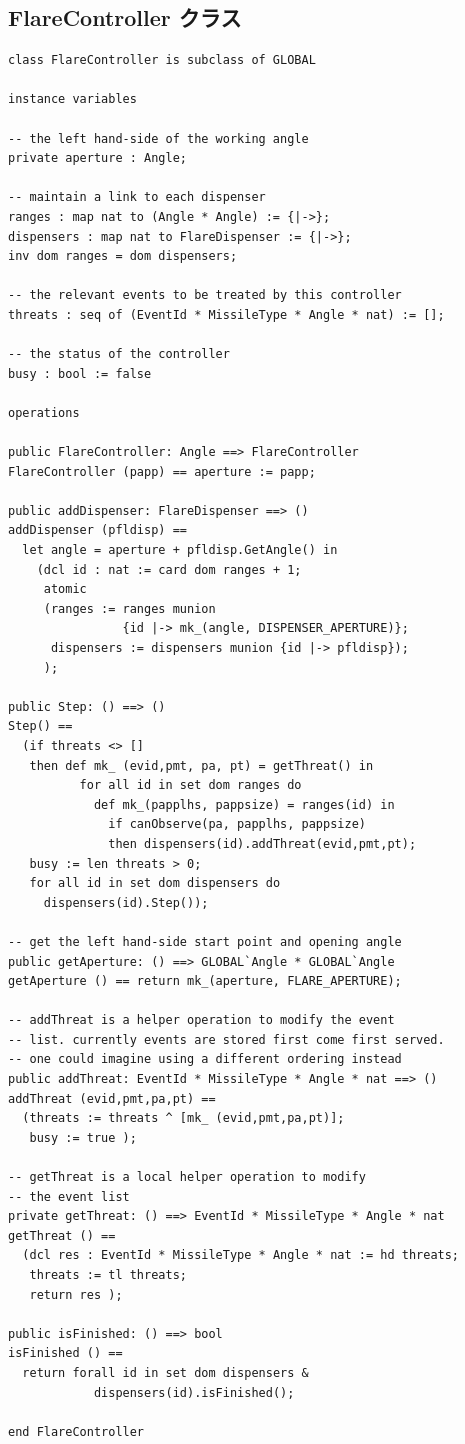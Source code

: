 \documentclass[\pformat,12pt]{jreport}
\begin{document}
\subsection{FlareController クラス}

\begin{lstlisting}
class FlareController is subclass of GLOBAL

instance variables

-- the left hand-side of the working angle
private aperture : Angle;

-- maintain a link to each dispenser
ranges : map nat to (Angle * Angle) := {|->};
dispensers : map nat to FlareDispenser := {|->};
inv dom ranges = dom dispensers;

-- the relevant events to be treated by this controller
threats : seq of (EventId * MissileType * Angle * nat) := [];

-- the status of the controller
busy : bool := false

operations

public FlareController: Angle ==> FlareController
FlareController (papp) == aperture := papp;

public addDispenser: FlareDispenser ==> ()
addDispenser (pfldisp) ==
  let angle = aperture + pfldisp.GetAngle() in
    (dcl id : nat := card dom ranges + 1;
     atomic
     (ranges := ranges munion 
                {id |-> mk_(angle, DISPENSER_APERTURE)};
      dispensers := dispensers munion {id |-> pfldisp});
     );

public Step: () ==> ()
Step() ==
  (if threats <> []
   then def mk_ (evid,pmt, pa, pt) = getThreat() in
          for all id in set dom ranges do
            def mk_(papplhs, pappsize) = ranges(id) in
              if canObserve(pa, papplhs, pappsize)
              then dispensers(id).addThreat(evid,pmt,pt);
   busy := len threats > 0;
   for all id in set dom dispensers do
     dispensers(id).Step());
 
-- get the left hand-side start point and opening angle
public getAperture: () ==> GLOBAL`Angle * GLOBAL`Angle
getAperture () == return mk_(aperture, FLARE_APERTURE);

-- addThreat is a helper operation to modify the event
-- list. currently events are stored first come first served.
-- one could imagine using a different ordering instead
public addThreat: EventId * MissileType * Angle * nat ==> ()
addThreat (evid,pmt,pa,pt) ==
  (threats := threats ^ [mk_ (evid,pmt,pa,pt)];
   busy := true );

-- getThreat is a local helper operation to modify 
-- the event list
private getThreat: () ==> EventId * MissileType * Angle * nat
getThreat () ==
  (dcl res : EventId * MissileType * Angle * nat := hd threats;
   threats := tl threats;
   return res );

public isFinished: () ==> bool
isFinished () ==
  return forall id in set dom dispensers &
            dispensers(id).isFinished();

end FlareController
\end{lstlisting}
\end{document}
